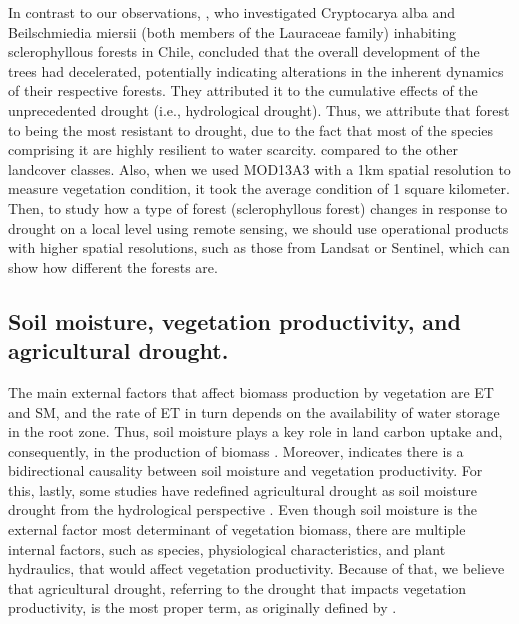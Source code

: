 \documentclass[
  number,
  preprint,
  3p,
  onecolumn]{elsarticle}
\begin{document}
In contrast to our observations, \citep{Venegas2022}, who investigated
Cryptocarya alba and Beilschmiedia miersii (both members of the
Lauraceae family) inhabiting sclerophyllous forests in Chile, concluded
that the overall development of the trees had decelerated, potentially
indicating alterations in the inherent dynamics of their respective
forests. They attributed it to the cumulative effects of the
unprecedented drought (i.e., hydrological drought). Thus, we attribute
that forest to being the most resistant to drought, due to the fact that
most of the species comprising it are highly resilient to water
scarcity. compared to the other landcover classes. Also, when we used
MOD13A3 with a 1km spatial resolution to measure vegetation condition,
it took the average condition of 1 square kilometer. Then, to study how
a type of forest (sclerophyllous forest) changes in response to drought
on a local level using remote sensing, we should use operational
products with higher spatial resolutions, such as those from Landsat or
Sentinel, which can show how different the forests are.

\hypertarget{soil-moisture-vegetation-productivity-and-agricultural-drought.}{%
\subsection{Soil moisture, vegetation productivity, and agricultural
drought.}\label{soil-moisture-vegetation-productivity-and-agricultural-drought.}}

The main external factors that affect biomass production by vegetation
are ET and SM, and the rate of ET in turn depends on the availability of
water storage in the root zone. Thus, soil moisture plays a key role in
land carbon uptake and, consequently, in the production of biomass
\citep{Humphrey2021}. Moreover, \citep{Zhang2022} indicates there is a
bidirectional causality between soil moisture and vegetation
productivity. For this, lastly, some studies have redefined agricultural
drought as soil moisture drought from the hydrological perspective
\citep{Loon2016, Samaniego2018}. Even though soil moisture is the
external factor most determinant of vegetation biomass, there are
multiple internal factors, such as species, physiological
characteristics, and plant hydraulics, that would affect vegetation
productivity. Because of that, we believe that agricultural drought,
referring to the drought that impacts vegetation productivity, is the
most proper term, as originally defined by \citep{Wilhite1985}.
\end{document}
